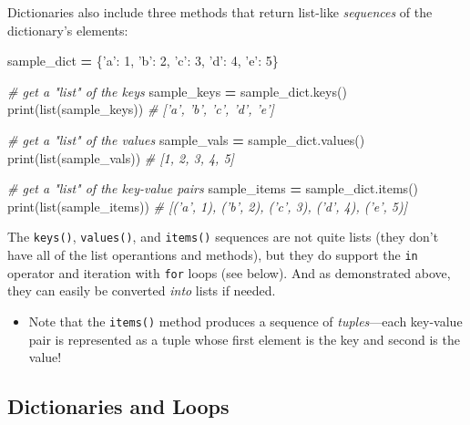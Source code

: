 \documentclass[]{book}
\newenvironment{Shaded}{\begin{snugshade}}{\end{snugshade}}
\newcommand{\DecValTok}[1]{\textcolor[rgb]{0.00,0.00,0.81}{#1}}
\newcommand{\StringTok}[1]{\textcolor[rgb]{0.31,0.60,0.02}{#1}}
\newcommand{\CommentTok}[1]{\textcolor[rgb]{0.56,0.35,0.01}{\textit{#1}}}
\newcommand{\OperatorTok}[1]{\textcolor[rgb]{0.81,0.36,0.00}{\textbf{#1}}}
\newcommand{\BuiltInTok}[1]{#1}
\newcommand{\NormalTok}[1]{#1}
\providecommand{\tightlist}{%
  \setlength{\itemsep}{0pt}\setlength{\parskip}{0pt}}
\begin{document}
Dictionaries also include three methods that return list-like
\emph{sequences} of the dictionary's elements:

\begin{Shaded}
\begin{Highlighting}[]
\NormalTok{sample_dict }\OperatorTok{=}\NormalTok{ \{}\StringTok{'a'}\NormalTok{: }\DecValTok{1}\NormalTok{, }\StringTok{'b'}\NormalTok{: }\DecValTok{2}\NormalTok{, }\StringTok{'c'}\NormalTok{: }\DecValTok{3}\NormalTok{, }\StringTok{'d'}\NormalTok{: }\DecValTok{4}\NormalTok{, }\StringTok{'e'}\NormalTok{: }\DecValTok{5}\NormalTok{\}}

\CommentTok{# get a "list" of the keys}
\NormalTok{sample_keys }\OperatorTok{=}\NormalTok{ sample_dict.keys()}
\BuiltInTok{print}\NormalTok{(}\BuiltInTok{list}\NormalTok{(sample_keys))  }\CommentTok{# ['a', 'b', 'c', 'd', 'e']}

\CommentTok{# get a "list" of the values}
\NormalTok{sample_vals }\OperatorTok{=}\NormalTok{ sample_dict.values()}
\BuiltInTok{print}\NormalTok{(}\BuiltInTok{list}\NormalTok{(sample_vals))  }\CommentTok{# [1, 2, 3, 4, 5]}

\CommentTok{# get a "list" of the key-value pairs}
\NormalTok{sample_items }\OperatorTok{=}\NormalTok{ sample_dict.items()}
\BuiltInTok{print}\NormalTok{(}\BuiltInTok{list}\NormalTok{(sample_items))  }\CommentTok{# [('a', 1), ('b', 2), ('c', 3), ('d', 4), ('e', 5)]}
\end{Highlighting}
\end{Shaded}

The \texttt{keys()}, \texttt{values()}, and \texttt{items()} sequences
are not quite lists (they don't have all of the list operantions and
methods), but they do support the \texttt{in} operator and iteration
with \texttt{for} loops (see below). And as demonstrated above, they can
easily be converted \emph{into} lists if needed.

\begin{itemize}
\tightlist
\item
  Note that the \texttt{items()} method produces a sequence of
  \emph{tuples}---each key-value pair is represented as a tuple whose
  first element is the key and second is the value!
\end{itemize}

\hypertarget{dictionaries-and-loops}{\subsection{Dictionaries and
Loops}\label{dictionaries-and-loops}}
\end{document}
